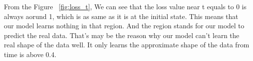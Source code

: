From the Figure ~\ref{fig:loss_t}, We can see that the loss value near t equals to 0 is always aorund 1, which is as same as it is at the initial state. This means that our model learns nothing in that region. And the region stands for our model to predict the real data. That's may be the reason why our model can't learn the real shape of the data well. It only learns the approximate shape of the data from time is above 0.4.





